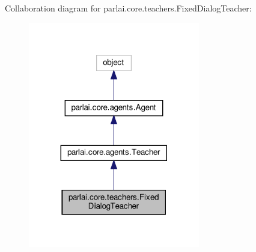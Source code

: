 Collaboration diagram for parlai.\+core.\+teachers.\+Fixed\+Dialog\+Teacher\+:
\nopagebreak
\begin{figure}[H]
\begin{center}
\leavevmode
\includegraphics[width=212pt]{d4/d61/classparlai_1_1core_1_1teachers_1_1FixedDialogTeacher__coll__graph}
\end{center}
\end{figure}
